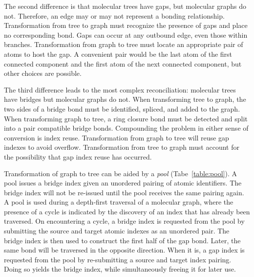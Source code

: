 \documentclass{article}
\begin{document}
The second difference is that molecular trees have gaps, but molecular graphs do not. Therefore, an edge may or may not represent a bonding relationship. Transformation from tree to graph must recognize the presence of gaps and place no corresponding bond. Gaps can occur at any outbound edge, even those within branches. Transformation from graph to tree must locate an appropriate pair of atoms to host the gap. A convenient pair would be the last atom of the first connected component and the first atom of the next connected component, but other choices are possible.

The third difference leads to the most complex reconciliation: molecular trees have bridges but molecular graphs do not. When transforming tree to graph, the two sides of a bridge bond must be identified, spliced, and added to the graph. When transforming graph to tree, a ring closure bond must be detected and split into a pair compatible bridge bonds. Compounding the problem in either sense of conversion is index reuse. Transformation from graph to tree will reuse gap indexes to avoid overflow. Transformation from tree to graph must account for the possibility that gap index reuse has occurred.

Transformation of graph to tree can be aided by a \textit{pool} (Tabe~\ref{table:pool}). A pool issues a bridge index given an unordered pairing of atomic identifiers. The bridge index will not be re-issued until the pool receives the same pairing again. A pool is used during a depth-first traversal of a molecular graph, where the presence of a cycle is indicated by the discovery of an index that has already been traversed. On encountering a cycle, a bridge index is requested from the pool by submitting the source and target atomic indexes as an unordered pair. The bridge index is then used to construct the first half of the gap bond. Later, the same bond will be traversed in the opposite direction. When it is, a gap index is requested from the pool by re-submitting a source and target index pairing. Doing so yields the bridge index, while simultaneously freeing it for later use.
\end{document}
